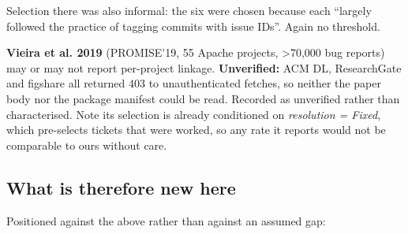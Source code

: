 \documentclass[11pt,a4paper]{article}
\begin{document}
Selection there was also informal: the six were chosen because each ``largely followed the practice of tagging commits with issue IDs''. Again no threshold.

\textbf{Vieira et al. 2019} \cite{vieira2019reports} (PROMISE'19, 55 Apache projects, >70,000 bug reports) may or may not report per-project linkage. \textbf{Unverified:} ACM DL, ResearchGate and figshare all returned 403 to unauthenticated fetches, so neither the paper body nor the package manifest could be read. Recorded as unverified rather than characterised. Note its selection is already conditioned on \emph{resolution = Fixed}, which pre-selects tickets that were worked, so any rate it reports would not be comparable to ours without care.

\subsection{What is therefore new here}
\label{sec:2.2}

Positioned against the above rather than against an assumed gap:
\end{document}
